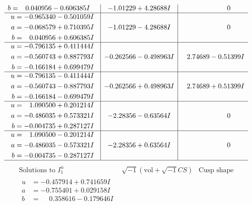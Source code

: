 \documentclass[1p]{elsarticle_modified}
\theoremstyle{definition}
\newcommand{\I}{\sqrt{-1}}
\begin{document}
$$\begin{array}{c|c|c}
\begin{aligned}
b &= \phantom{-}0.040956 - 0.606385 I\end{aligned}
 & -1.01229 + 4.28688 I & \phantom{-0.000000 } 0 \\ \hline\begin{aligned}
u &= -0.965340 - 0.501059 I \\
a &= -0.068579 + 0.710395 I \\
b &= \phantom{-}0.040956 + 0.606385 I\end{aligned}
 & -1.01229 - 4.28688 I & \phantom{-0.000000 } 0 \\ \hline\begin{aligned}
u &= -0.796135 + 0.411444 I \\
a &= -0.560743 + 0.887793 I \\
b &= -0.166184 + 0.699479 I\end{aligned}
 & -0.262566 - 0.498963 I & \phantom{-}2.74689 - 0.51399 I \\ \hline\begin{aligned}
u &= -0.796135 - 0.411444 I \\
a &= -0.560743 - 0.887793 I \\
b &= -0.166184 - 0.699479 I\end{aligned}
 & -0.262566 + 0.498963 I & \phantom{-}2.74689 + 0.51399 I \\ \hline\begin{aligned}
u &= \phantom{-}1.090500 + 0.201214 I \\
a &= -0.486035 + 0.573321 I \\
b &= -0.004735 + 0.287127 I\end{aligned}
 & -2.28356 - 0.63564 I & \phantom{-0.000000 } 0 \\ \hline\begin{aligned}
u &= \phantom{-}1.090500 - 0.201214 I \\
a &= -0.486035 - 0.573321 I \\
b &= -0.004735 - 0.287127 I\end{aligned}
 & -2.28356 + 0.63564 I & \phantom{-0.000000 } 0\\
 \hline 
 \end{array}$$\newpage$$\begin{array}{c|c|c}  
\text{Solutions to }I^u_{1}& \I (\text{vol} + \sqrt{-1}CS) & \text{Cusp shape}\\
 \hline 
\begin{aligned}
u &= -0.457914 + 0.741659 I \\
a &= -0.755401 + 0.029158 I \\
b &= \phantom{-}0.358616 - 0.179646 I\end{aligned}

\end{array}$$
\end{document}
